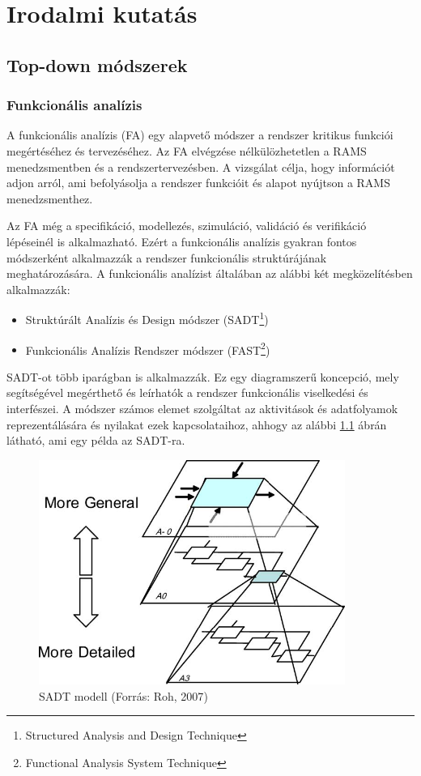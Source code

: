 \chapter{Irodalmi kutatás}\label{chap:irodalom}

\section{Top-down módszerek}
\subsection{Funkcionális analízis}
A funkcionális analízis (FA) egy alapvető módszer a rendszer kritikus funkciói megértéséhez és tervezéséhez.
Az FA elvégzése nélkülözhetetlen a RAMS menedzsmentben és a rendszertervezésben.
A vizsgálat célja, hogy információt adjon arról, ami befolyásolja a rendszer funkcióit és alapot nyújtson a RAMS menedzsmenthez.

Az FA még a specifikáció, modellezés, szimuláció, validáció és verifikáció lépéseinél is alkalmazható.
Ezért a funkcionális analízis gyakran fontos módszerként alkalmazzák a rendszer funkcionális struktúrájának meghatározására.
A funkcionális analízist általában az alábbi két megközelítésben alkalmazzák:
\begin{itemize}
    \item Struktúrált Analízis és Design módszer (SADT\footnote{Structured Analysis and Design Technique})
    \item Funkcionális Analízis Rendszer módszer (FAST\footnote{Functional Analysis System Technique})
\end{itemize}
SADT-ot több iparágban is alkalmazzák. 
Ez egy diagramszerű koncepció, mely segítségével megérthető és leírhatók a rendszer funkcionális viselkedési és interfészei.
A módszer számos elemet szolgáltat az aktivitások és adatfolyamok reprezentálására és nyilakat ezek kapcsolataihoz, ahhogy az alábbi \ref{fig:sadt} ábrán látható, ami egy példa az SADT-ra.

\begin{figure}
    \footnotesize
    \centering
    \includegraphics[width=100mm, keepaspectratio]{figures/roh2007.jpg}
    \caption{SADT modell (Forrás: Roh, 2007\cite{doi:10.1080/13675560701478240})}
    \label{fig:sadt}
\end{figure}

